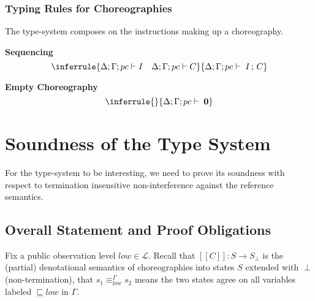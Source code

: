 \documentclass[12pt,a4paper,twoside]{book}
\newcommand{\llbracket}{[\![}
\newcommand{\rrbracket}{]\!]}
\newcommand{\MCL}{\mathscr{L}}
\begin{document}
\subsection{Typing Rules for Choreographies}
The type-system composes on the instructions making up a choreography.

\medskip
\noindent\textbf{Sequencing}
\[
  \inferrule
  { \Delta;\Gamma;pc \vdash I \quad \Delta;\Gamma;pc \vdash C }
  { \Delta;\Gamma;pc \vdash \; I \,;\, C }
\]

\medskip
\noindent\textbf{Empty Choreography}
\[
  \inferrule
  {}{\Delta;\Gamma;pc \vdash \; \boldsymbol{0}}
\]

\chapter{Soundness of the Type System}
For the type-system to be interesting, we need to prove its soundness with respect to termination insensitive non-interference against the reference semantics.

\section{Overall Statement and Proof Obligations}

Fix a public observation level \(low \in \MCL\).
Recall that \( \llbracket C \rrbracket : S \to S_\perp \) is the (partial) denotational semantics of choreographies into states \(S\) extended with \(\perp\) (non-termination), that \(s_1 \equiv^\Gamma_{low} s_2\) means the two states agree on all variables labeled \(\sqsubseteq low\) in $\Gamma$.
\end{document}
